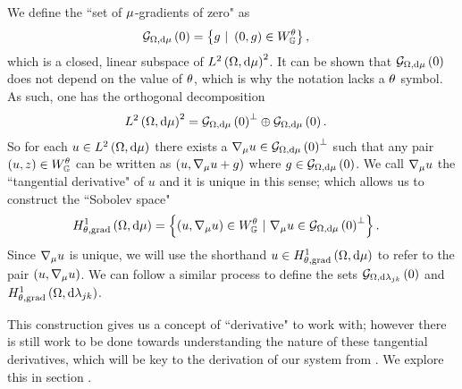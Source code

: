 We define the ``set of $\mu$-gradients of zero" as
\begin{align*}
	\mathcal{G}_{ \Omega, \mathrm{d}\mu}\left( 0 \right) &= \left\{  g \ \vert \ \left( 0,g \right)\in W^{\theta}_{\mathbb{G}}  \right\},
\end{align*}
which is a closed, linear subspace of $L^{2}\left( \Omega,\mathrm{d}\mu \right)^2$.
It can be shown that $\mathcal{G}_{ \Omega, \mathrm{d}\mu}\left( 0 \right)$ does not depend on the value of $\theta$, which is why the notation lacks a $\theta$ symbol.
As such, one has the orthogonal decomposition
\begin{align*}
	L^{2}\left( \Omega,\mathrm{d}\mu \right)^2 &= \mathcal{G}_{ \Omega, \mathrm{d}\mu}\left( 0 \right)^{\perp} \oplus \mathcal{G}_{ \Omega, \mathrm{d}\mu}\left( 0 \right).
\end{align*}
So for each $u\in L^{2}\left( \Omega,\mathrm{d}\mu \right)$ there exists a $\nabla_\mu u\in\mathcal{G}_{ \Omega, \mathrm{d}\mu}\left( 0 \right)^{\perp}$ such that any pair $\left( u,z \right)\in W^{\theta}_{\mathbb{G}}$ can be written as $\left( u,\nabla_\mu u + g \right)$ where $g\in\mathcal{G}_{ \Omega, \mathrm{d}\mu}\left( 0 \right)$.
We call $\nabla_\mu u$ the ``tangential derivative" of $u$ and it is unique in this sense; which allows us to construct the ``Sobolev space"
\begin{align*}
	H^1_{\theta, \mathrm{grad}}\left( \Omega, \mathrm{d}\mu \right) &= \left\{  \left( u, \nabla_\mu u \right)\in W^{\theta}_{\mathbb{G}} \ \vert \ \nabla_\mu u \in \mathcal{G}_{ \Omega, \mathrm{d}\mu}\left( 0 \right)^{\perp}  \right\}.
\end{align*}
Since $\nabla_\mu u$ is unique, we will use the shorthand $u\in H^1_{\theta, \mathrm{grad}}\left( \Omega, \mathrm{d}\mu \right)$ to refer to the pair $\left( u, \nabla_\mu u \right)$. 
We can follow a similar process to define the sets $\mathcal{G}_{ \Omega, \mathrm{d}\lambda_{jk}}\left( 0 \right)$ and $H^1_{\theta, \mathrm{grad}}\left( \Omega, \mathrm{d}\lambda_{jk} \right)$. \newline

This construction gives us a concept of ``derivative" to work with; however there is still work to be done towards understanding the nature of these tangential derivatives, which will be key to the derivation of our system  from .
We explore this in section .

